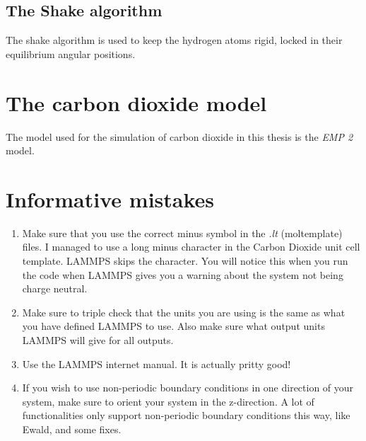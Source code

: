 \documentclass[twoside,english]{uiofysmaster}
\begin{document}
\subsection{The Shake algorithm}
The shake algorithm is used to keep the hydrogen atoms rigid, locked in their equilibrium angular positions.

\section{The carbon dioxide model}
The model used for the simulation of carbon dioxide in this thesis is the \textit{EMP 2} model.

\section{Informative mistakes}

\begin{enumerate}
 \item Make sure that you use the correct minus symbol in the \textit{.lt} (moltemplate) files. I managed to use a long minus character in the Carbon Dioxide unit cell template. LAMMPS skips the character. You will notice this when you run the code when LAMMPS gives you a warning about the system not being charge neutral.
 \item Make sure to triple check that the units you are using is the same as what you have defined LAMMPS to use. Also make sure what output units LAMMPS will give for all outputs.
 \item Use the LAMMPS internet manual. It is actually pritty good!
 \item If you wish to use non-periodic boundary conditions in one direction of your system, make sure to orient your system in the z-direction. A lot of functionalities only support non-periodic boundary conditions this way, like Ewald, and some fixes.
\end{enumerate}
\end{document}
